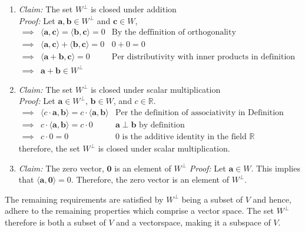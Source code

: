 \documentclass{article}
\begin{document}
\begin{enumerate}
	\item {\it Claim: } The set $W^{\perp}$ is closed under addition \\[0.05in]
				{\it Proof: } Let $\mathbf{a},\mathbf{b} \in W^{\perp}$ and $\mathbf{c} \in W$, 
\begin{equation*} \begin{aligned}
\implies & \langle \mathbf{a},\mathbf{c}  \rangle = \langle \mathbf{b},\mathbf{c} \rangle = 0 & \text{By the deffinition of orthogonality}\\
\implies & \langle \mathbf{a},\mathbf{c} \rangle + \langle \mathbf{b},\mathbf{c} \rangle = 0 & 0 + 0 = 0 \\
\implies & \langle \mathbf{a} + \mathbf{b}, \mathbf{c} \rangle = 0 & \text{Per distributivity with inner products in definition 2.60} \\
\implies & \mathbf{a} + \mathbf{b} \in W^{\perp}
\end{aligned}\end{equation*}
	\item {\it Claim: } The set $W^{\perp}$ is closed under scalar multiplication \\[0.05in]
				{\it Proof: } Let $\mathbf{a} \in W^{\perp}$, $\mathbf{b} \in W$, and $c \in \mathbb{R}$.
				\begin{equation*} \begin{aligned}
					\implies &\langle c\cdot \mathbf{a},\mathbf{b}\rangle  = c \cdot \langle \mathbf{a},\mathbf{b} \rangle & \text{Per the definition of associativity in Definition 2.60} \\
					\implies &c\cdot \langle \mathbf{a},\mathbf{b} \rangle = c\cdot 0 &\mathbf{a} \perp \mathbf{b} \text{ by definition} \\
					\implies &c\cdot 0 = 0 & 0 \text{ is the additive identity in the field $\mathbb{R}$}
				\end{aligned}\end{equation*}
therefore, the set $W^{\perp}$ is closed under scalar multiplication.
	\item {\it Claim: } The zero vector, $\mathbf{0}$ is an element of $W^{\perp}$
				{\it Proof: } Let $\mathbf{a} \in W$. This implies that $\langle \mathbf{a},\mathbf{0} \rangle = 0$. Therefore, the zero vector is an element of $W^{\perp}$.
\end{enumerate}
The remaining requirements are satisfied by $W^{\perp}$ being a subset of $V$ and hence, adhere to the remaining properties which comprise a vector space. The set $W^{\perp}$ therefore is both a subset of $V$ and a vectorspace, making it a subspace of $V$.
\end{document}
